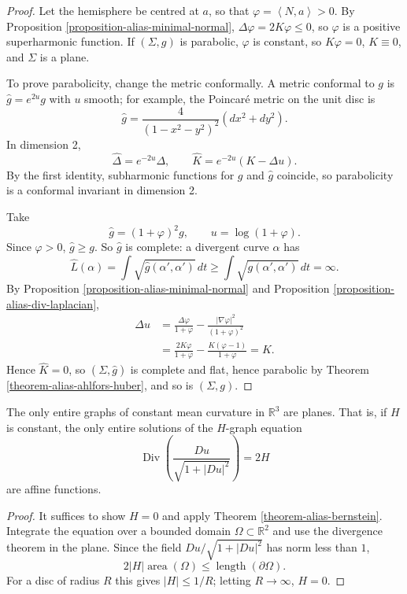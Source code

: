 \begin{proof}
Let the hemisphere be centred at $a$, so
that $\varphi=\left\langle{} N,a
\right\rangle{}>0$. By Proposition
\ref{proposition-alias-minimal-normal},
$\Delta\varphi=2K\varphi\leq 0$, so
$\varphi$ is a positive superharmonic
function. If $(\Sigma,g)$ is parabolic,
$\varphi$ is constant, so $K\varphi=0$,
$K\equiv 0$, and $\Sigma$ is a plane.

To prove parabolicity, change the metric
conformally. A metric conformal to $g$ is
$\hat{g}=e^{2u}g$ with $u$ smooth; for
example, the Poincar\'e metric on the unit
disc is
$$
\hat{g}=\frac{4}{(1-x^2-y^2)^2}
(dx^2+dy^2).
$$
In dimension 2,
$$
\hat{\Delta}=e^{-2u}\Delta,
\qquad
\hat{K}=e^{-2u}(K-\Delta u).
$$
By the first identity, subharmonic
functions for $g$ and $\hat{g}$ coincide,
so parabolicity is a conformal
invariant in dimension 2.

Take
$$
\hat{g}=(1+\varphi)^2g,
\qquad
u=\log(1+\varphi).
$$
Since $\varphi>0$, $\hat{g}\geq g$. So
$\hat{g}$ is complete: a divergent curve
$\alpha$ has
$$
\hat{L}(\alpha)=\int\sqrt{\hat{g}
(\alpha',\alpha')}\,dt
\geq\int\sqrt{g(\alpha',\alpha')}\,dt
=\infty.
$$
By Proposition
\ref{proposition-alias-minimal-normal}
and Proposition
\ref{proposition-alias-div-laplacian},
$$
\begin{aligned}
\Delta u
&=\frac{\Delta\varphi}{1+\varphi}
-\frac{|\nabla\varphi|^2}
{(1+\varphi)^2}\\
&=\frac{2K\varphi}{1+\varphi}
-\frac{K(\varphi-1)}{1+\varphi}
=K.
\end{aligned}
$$
Hence $\hat{K}=0$, so $(\Sigma,\hat{g})$
is complete and flat, hence parabolic by
Theorem \ref{theorem-alias-ahlfors-huber},
and so is $(\Sigma,g)$.
\end{proof}

\begin{theorem}[Heinz, 1955]
\label{theorem-alias-heinz}
The only entire graphs of constant mean
curvature in $\mathbb{R}^3$ are planes.
That is, if $H$ is constant, the only
entire solutions of the $H$-graph
equation
$$
\operatorname{Div}\left(
\frac{Du}{\sqrt{1+|Du|^2}}
\right)=2H
$$
are affine functions.
\end{theorem}

\begin{proof}
It suffices to show $H=0$ and apply
Theorem \ref{theorem-alias-bernstein}.
Integrate the equation over a bounded
domain $\Omega\subset\mathbb{R}^2$ and use
the divergence theorem in the plane. Since
the field $Du/\sqrt{1+|Du|^2}$ has norm
less than $1$,
$$
2|H|\operatorname{area}(\Omega)
\leq\operatorname{length}(\partial\Omega).
$$
For a disc of radius $R$ this gives
$|H|\leq 1/R$; letting $R\to\infty$,
$H=0$.
\end{proof}

